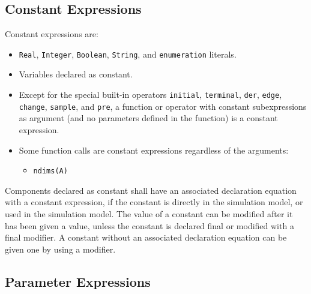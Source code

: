 \subsection{Constant Expressions}

Constant expressions are:
\begin{itemize}
\item
  \lstinline!Real!, \lstinline!Integer!, \lstinline!Boolean!, \lstinline!String!, and \lstinline!enumeration! literals.
\item
  Variables declared as constant.
\item
  Except for the special built-in operators \lstinline!initial!, \lstinline!terminal!, \lstinline!der!,
  \lstinline!edge!, \lstinline!change!, \lstinline!sample!, and \lstinline!pre!, a function or operator with constant
  subexpressions as argument (and no parameters defined in the function)
  is a constant expression.
\item
  Some function calls are constant expressions regardless of the arguments:
  \begin{itemize}
  \item
    \lstinline!ndims(A)!
  \end{itemize}
\end{itemize}

Components declared as constant shall have an associated declaration
equation with a constant expression, if the constant is directly in the
simulation model, or used in the simulation model. The value of a
constant can be modified after it has been given a value, unless the
constant is declared final or modified with a final modifier. A constant
without an associated declaration equation can be given one by using a
modifier.

\subsection{Parameter Expressions}

